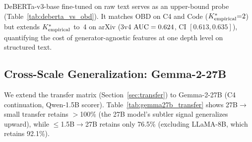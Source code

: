 DeBERTa-v3-base fine-tuned on raw text serves as an upper-bound probe (Table~\ref{tab:deberta_vs_obd}).
It matches OBD on C4 and Code (${K^*_{\text{empirical}}}{=}2$) but extends $\Kempirical$ to~4 on arXiv (3v4 $\text{AUC} = 0.624$, CI $[0.613, 0.635]$), quantifying the cost of generator-agnostic features at one depth level on structured text.

\begin{table}[H]
\centering
\caption{$\Kempirical$ comparison: OBD (15D) vs.\ DeBERTa-v3-base (Qwen2.5-1.5B base, continuation mode; $\theta{=}0.60$).}
\label{tab:deberta_vs_obd}
\footnotesize
{}
\end{table}

\subsection{Cross-Scale Generalization: Gemma-2-27B}
\label{sec:gemma27b_transfer}
\label{sec:gemma27b_filtering}

We extend the transfer matrix (Section~\ref{sec:transfer}) to Gemma-2-27B (C4 continuation, Qwen-1.5B scorer).
Table~\ref{tab:gemma27b_transfer} shows 27B$\to$small transfer retains $>$100\% (the 27B model's subtler signal generalizes upward), while ${\leq}$1.5B$\to$27B retains only 76.5\% (excluding LLaMA-8B, which retains 92.1\%).

\begin{table}[H]
\centering
\small
\caption{Cross-scale transfer retention (\%) between Gemma-2-27B and 1B--8B models.}
\label{tab:gemma27b_transfer}
\end{table}

